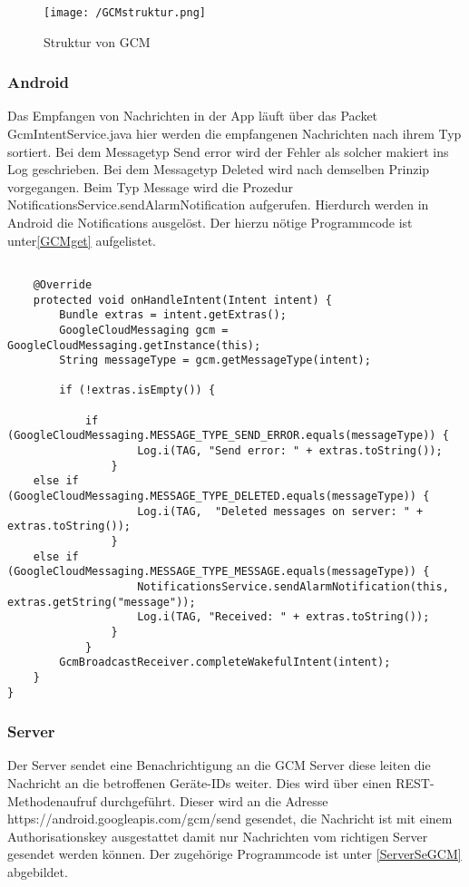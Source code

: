 \begin{figure}[H]
\centering
\texttt{[image: /GCMstruktur.png]}
\caption{Struktur von GCM}
\label{fig:GCMstrukutr}
\end{figure}

\subsubsection*{Android}
Das Empfangen von Nachrichten in der App läuft über das Packet GcmIntentService.java hier werden die empfangenen Nachrichten nach ihrem Typ sortiert. Bei dem Messagetyp Send error wird der Fehler als solcher makiert ins Log geschrieben. Bei dem Messagetyp Deleted wird nach demselben Prinzip vorgegangen. Beim Typ Message wird die Prozedur NotificationsService.sendAlarmNotification aufgerufen. Hierdurch werden in Android die Notifications ausgelöst. Der hierzu nötige Programmcode ist unter\ref{GCMget} aufgelistet.\\

\begin{lstlisting}[caption={Empfangen von GCM Nachrichten unter Android},label=lst:GCMget]

    @Override
    protected void onHandleIntent(Intent intent) {
        Bundle extras = intent.getExtras();
        GoogleCloudMessaging gcm = GoogleCloudMessaging.getInstance(this);
        String messageType = gcm.getMessageType(intent);

        if (!extras.isEmpty()) {

            if (GoogleCloudMessaging.MESSAGE_TYPE_SEND_ERROR.equals(messageType)) {
            		Log.i(TAG, "Send error: " + extras.toString());
	            }
 	else if (GoogleCloudMessaging.MESSAGE_TYPE_DELETED.equals(messageType)) {
            		Log.i(TAG,  "Deleted messages on server: " + extras.toString());
            	}
	else if (GoogleCloudMessaging.MESSAGE_TYPE_MESSAGE.equals(messageType)) {
            		NotificationsService.sendAlarmNotification(this, extras.getString("message"));
                	Log.i(TAG, "Received: " + extras.toString());
            	}
        	}
        GcmBroadcastReceiver.completeWakefulIntent(intent);
	} 
}

\end{lstlisting}

\subsubsection*{Server}
Der Server sendet eine Benachrichtigung an die GCM Server diese leiten die Nachricht an die betroffenen Geräte-IDs weiter. Dies wird über einen REST-Methodenaufruf durchgeführt. Dieser wird an die Adresse https://android.googleapis.com/gcm/send gesendet, die Nachricht ist mit einem Authorisationskey ausgestattet damit nur Nachrichten vom richtigen Server gesendet werden können. Der zugehörige Programmcode ist unter \ref{ServerSeGCM} abgebildet.


